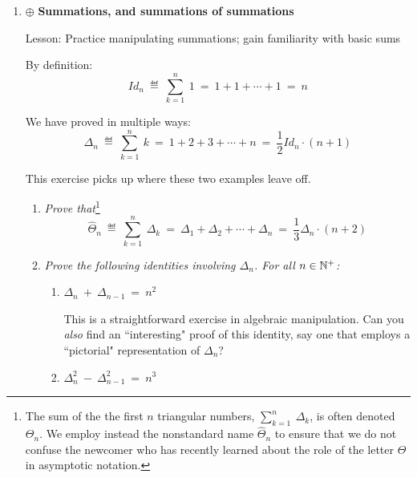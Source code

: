 \begin{enumerate}
{\em Propose another analysis by gathering the terms by powers of $3$.}

\medskip\item
$\oplus$ {\bf Summations, and summations of summations}

{\sc Lesson:} Practice manipulating summations; gain familiarity with basic sums

\smallskip

By definition:
\[ Id_n \ \eqdef \ \sum_{k=1}^n \ 1 \ = \ 1 + 1 + \cdots +1 \  = \ n \]

We have proved in multiple ways:
\[ \Delta_n \ \eqdef \  \sum_{k=1}^n \ k \ = \ 1+2+3+ \cdots +n \ = \ \frac{1}{2} Id_n \cdot (n+1) \]

\smallskip

This exercise picks up where these two examples leave off.

  \begin{enumerate}
  \item 
{\em Prove that}\footnote{\label{foot:Theta}The sum of the the first $n$ triangular numbers, $\sum_{k=1}^n \ \Delta_k$, is often denoted $\Theta_n$.  We employ instead the nonstandard name $\widehat{\Theta}_n$ to ensure that we do not confuse the newcomer who has recently learned about the role of the letter $\Theta$ in asymptotic notation.} 
\[ \widehat{\Theta}_n \ \eqdef \  \sum_{k=1}^n \ \Delta_k \ = \   
\Delta_1 + \Delta_2 + \cdots + \Delta_n \ = \ \frac{1}{3} \Delta_n \cdot (n+2) \]


  \medskip\item
{\em Prove the following identities involving $\Delta_n$.  For all $n \in \mathbb{N}^+$:}
    \begin{enumerate}
    \item
$\Delta_n \ + \ \Delta_{n-1} \ = \ n^2$

\smallskip

This is a straightforward exercise in algebraic manipulation.  Can you {\em also} find an ``interesting" proof of this identity, say one that employs a ``pictorial" representation of $\Delta_n$?

    \medskip\item
$\Delta_n^2 \ - \ \Delta_{n-1}^2 \ = \ n^3$


\end{enumerate}
\end{enumerate}
\end{enumerate}
